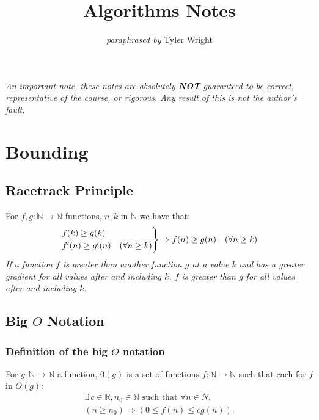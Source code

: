 \documentclass[a4paper, 12pt, twoside]{article}
\begin{document}
\title{Algorithms Notes}
\date{}
\author{\textit{paraphrased by} Tyler Wright}
\maketitle

\vfill

\textit{An important note, these notes are absolutely \textbf{NOT}
      guaranteed to be correct, representative of the course, or rigorous.
      Any result of this is not the author's fault.}

\newpage

\section{Bounding}

\subsection{Racetrack Principle}

For $f, g : \mathbb{N} \to \mathbb{N}$ functions, $n, k$ in $\mathbb{N}$
we have that:
\begin{align*}
      \begin{rcases*}
            f(k) \geq g(k) \\
            f'(n) \geq g'(n) \quad (\forall n \geq k)
      \end{rcases*} \Rightarrow
      f(n) \geq g(n) \quad (\forall n \geq k)
\end{align*}
\textit{If a function $f$ is greater than another function $g$ 
at a value $k$ and has a greater gradient for all values after
and including $k$, $f$ is greater than $g$ for all values 
after and including $k$.}

\subsection{Big $O$ Notation}

\subsubsection{Definition of the big $O$ notation}

For $g : \mathbb{N} \to \mathbb{N}$ a function, $0(g)$ is a set of
functions $f : \mathbb{N} \to \mathbb{N}$ such that each for
$f$ in $O(g)$:
\begin{gather*}
      \exists \, c \in \mathbb{R}, n_0 \in \mathbb{N}
      \text{ such that } \forall n \in N, \\
      (n \geq n_0) \Rightarrow (0 \leq f(n) \leq cg(n)).
\end{gather*}
\end{document}
